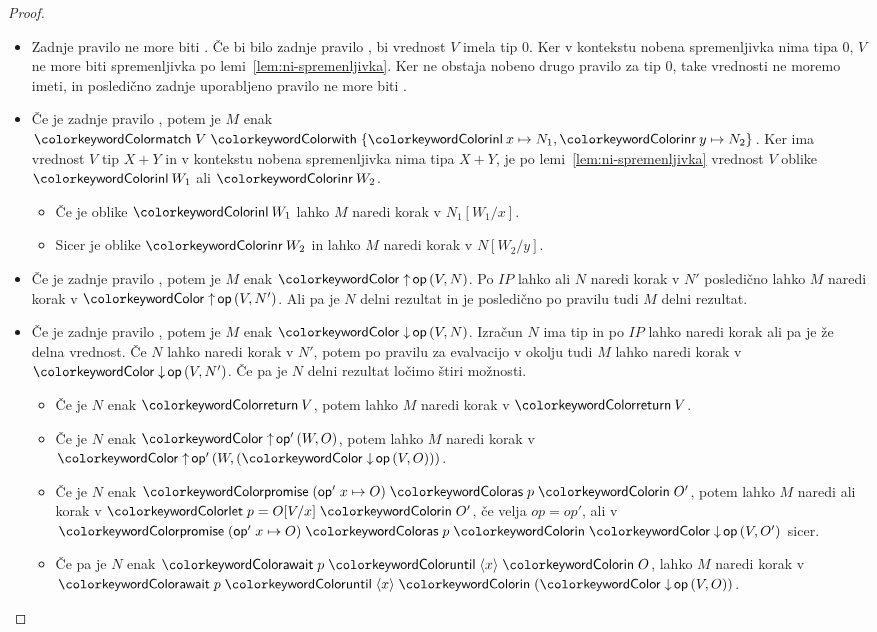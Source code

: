 \begin{proof}
\begin{itemize}
		\item Zadnje pravilo ne more biti . Če bi bilo zadnje pravilo , bi vrednost $V$ imela tip $0$. 
		Ker v kontekstu nobena spremenljivka nima tipa $0$, $V$ ne more biti spremenljivka po lemi~\ref{lem:ni-spremenljivka}.
		Ker ne obstaja nobeno drugo pravilo za tip $0$, take vrednosti ne moremo imeti, in posledično zadnje uporabljeno pravilo ne more biti .

		
		\item Če je zadnje pravilo , potem je $M$ enak $\tmmatch{V}{\tminl{x} \mapsto N_1, \tminr{y} \mapsto N_2}$.
		Ker ima vrednost $V$ tip $X + Y$ in v kontekstu nobena spremenljivka nima tipa $X + Y$, je po lemi~\ref{lem:ni-spremenljivka} vrednost $V$ oblike $\tminl{W_1}$ ali $\tminr{W_2}$.
		\begin{itemize}
			\item Če je oblike $\tminl{W_1}$ lahko $M$ naredi korak v $N_1[W_1/x]$.
			\item Sicer je oblike $\tminr{W_2}$ in lahko $M$ naredi korak v $N[W_2/y]$.
		\end{itemize}
		
		\item Če je zadnje pravilo , potem je $M$ enak $\tmopout{op}{V}{N}$.
		Po $IP$ lahko ali $N$ naredi korak v $N'$ posledično lahko $M$ naredi korak v $\tmopout{op}{V}{N'}$.
		Ali pa je $N$ delni rezultat in je posledično po pravilu  tudi $M$ delni rezultat.
		
		\item Če je zadnje pravilo , potem je $M$ enak $\tmopin{op}{V}{N}$. Izračun $N$ ima tip in po $IP$ lahko naredi korak ali pa je že delna vrednost. Če $N$ lahko naredi korak v $N'$, potem po pravilu za evalvacijo v okolju tudi $M$ lahko naredi korak v $\tmopin{op}{V}{N'}$. 
		Če pa je $N$ delni rezultat ločimo štiri možnosti.
		\begin{itemize}
			\item Če je $N$ enak $\tmreturn{V}$, potem lahko $M$ naredi korak v $\tmreturn{V}$.
			\item Če je $N$ enak $\tmopout{op'}{W}{O}$, potem lahko $M$ naredi korak v $\tmopout{op'}{W}{(\tmopin{op}{V}{O})}$.
			\item Če je $N$ enak $\tmwith{op'}{x}{O}{p}{O'}$, potem lahko $M$ naredi ali korak v $\tmlet{p}{O[V/x]}{O'}$, če velja $op = op'$, ali v $\tmwith{op'}{x}{O}{p}{\tmopin{op}{V}{O'}}$ sicer.
			\item Če pa je $N$ enak $\tmawait{p}{x}{O}$, lahko $M$ naredi korak v $\tmawait{p}{x}{(\tmopin{op}{V}{O})}$.
		\end{itemize}
		

\end{itemize}
\end{proof}
